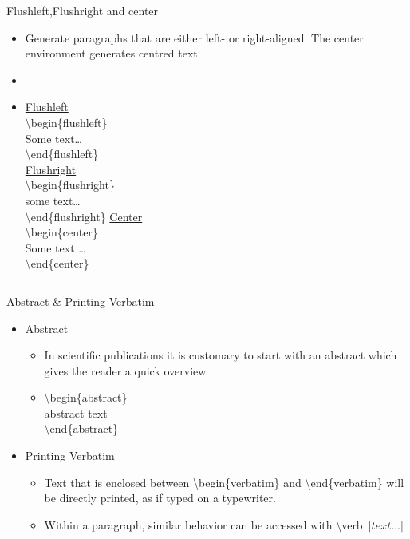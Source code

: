 \documentclass{beamer}
\begin{document}
\begin{frame}{Flushleft,Flushright and center }
\begin{itemize}
\pause \item Generate paragraphs that are either left- or right-aligned. The center environment generates centred text
\item[] 
\pause\item[]\begin{columns}[c]
\column{1.5in}
\underline{Flushleft}\\
\vspace{0.3cm}
\textbackslash begin\{flushleft\}\\
Some text\ldots\\
\textbackslash end\{flushleft\}\\
\column{1.5in}
\underline{Flushright}\\
\vspace{0.3cm}
\textbackslash begin\{flushright\}\\
some text\ldots\\
\textbackslash end\{flushright\}
\column{1.5in}
\underline{Center}\\
\vspace{0.3cm}
\textbackslash begin\{center\}\\
Some text \ldots\\
\textbackslash end\{center\}
\end{columns}
\end{itemize}
\end{frame}

\begin{frame}{Abstract \& Printing Verbatim}
\begin{itemize}
\pause\item[]\begin{block}{Abstract}
\begin{itemize}
\pause \item In scientific publications it is customary to start with an abstract which gives
the reader a quick overview 
\pause \item[] \textbackslash begin\{abstract\}\\
abstract text\\
\textbackslash end\{abstract\}
\end{itemize}
\end{block}
\pause \item[]\begin{block}{Printing Verbatim}
\begin{itemize}
\pause \item Text that is enclosed between \textbackslash begin\{verbatim\} and \textbackslash end\{verbatim\} will
be directly printed, as if typed on a typewriter.
\pause \item Within a paragraph, similar behavior can be accessed with \textbackslash verb~$|text...|$
\end{itemize}
\end{block}
\end{itemize}
\end{frame}
\end{document}
